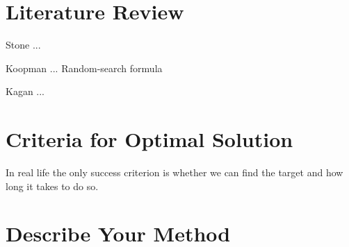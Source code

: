 \documentclass[12pt, letterpaper]{article}  %
\theoremstyle{definition}
\theoremstyle{remark}
\theoremstyle{plain}
\begin{document}


\section{Literature Review}\label{sec:litrev}


Stone ... \cite{83stone}

Koopman ... \cite{46koopman} Random-search formula

Kagan ... \cite{13kagan}






\section{Criteria for Optimal Solution}\label{sec:measure}


In real life the only success criterion is whether we can find the target and how long it takes to do so.


\section{Describe Your Method}\label{sec:mainmethod}
\end{document}
